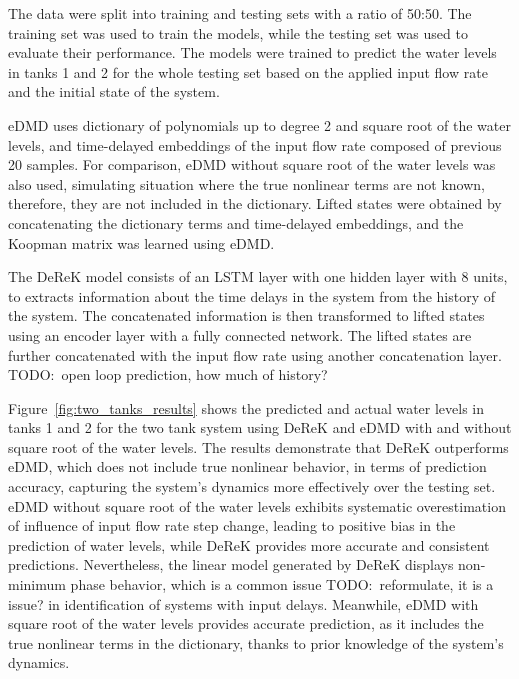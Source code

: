 \documentclass[conference]{IEEEtran}
\newcommand{\todo}[1]{{{\color{red} TODO:~#1	}} }
\begin{document}
The data were split into training and testing sets with a ratio of 50:50. The training set was used to train the models, while the testing set was used to evaluate their performance. The models were trained to predict the water levels in tanks 1 and 2 for the whole testing set based on the applied input flow rate and the initial state of the system.

eDMD uses dictionary of polynomials up to degree 2 and square root of the water levels, and time-delayed embeddings of the input flow rate composed of previous 20 samples. For comparison, eDMD without square root of the water levels was also used, simulating situation where the true nonlinear terms are not known, therefore, they are not included in the dictionary. Lifted states were obtained by concatenating the dictionary terms and time-delayed embeddings, and the Koopman matrix was learned using eDMD.

The DeReK model consists of an LSTM layer with one hidden layer with 8 units, to extracts information about the time delays in the system from the history of the system. The concatenated information is then transformed to lifted states using an encoder layer with a fully connected network. The lifted states are further concatenated with the input flow rate using another concatenation layer. \todo{open loop prediction, how much of history?}

Figure~\ref{fig:two_tanks_results} shows the predicted and actual water levels in tanks 1 and 2 for the two tank system using DeReK and eDMD with and without square root of the water levels. The results demonstrate that DeReK outperforms eDMD, which does not include true nonlinear behavior, in terms of prediction accuracy, capturing the system's dynamics more effectively over the testing set. eDMD without square root of the water levels exhibits systematic overestimation of influence of input flow rate step change, leading to positive bias in the prediction of water levels, while DeReK provides more accurate and consistent predictions. Nevertheless, the linear model generated by DeReK displays non-minimum phase behavior, which is a common issue\todo{reformulate, it is a issue?} in identification of systems with input delays. Meanwhile, eDMD with square root of the water levels provides accurate prediction, as it includes the true nonlinear terms in the dictionary, thanks to prior knowledge of the system's dynamics.
\end{document}
